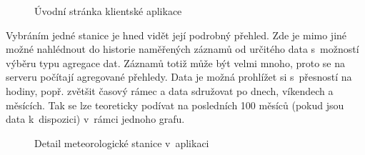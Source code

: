\begin{figure}[h]
	\centering
	\caption{Úvodní stránka klientské aplikace}
	\label{fig:app:homepage}
\end{figure}

Vybráním jedné stanice je hned vidět její podrobný přehled. Zde je mimo jiné možné nahlédnout do historie naměřených záznamů od určitého data s~možností výběru typu agregace dat. Záznamů totiž může být velmi mnoho, proto se na serveru počítají agregované přehledy. Data je možná prohlížet si s~přesností na hodiny, popř. zvětšit časový rámec a data sdružovat po dnech, víkendech a měsících. Tak se lze teoreticky podívat na posledních 100 měsíců (pokud jsou data k~dispozici) v~rámci jednoho grafu.

\begin{figure}[h]
	\centering
	\caption{Detail meteorologické stanice v~aplikaci}
	\label{fig:app:wsDetail}
\end{figure}

